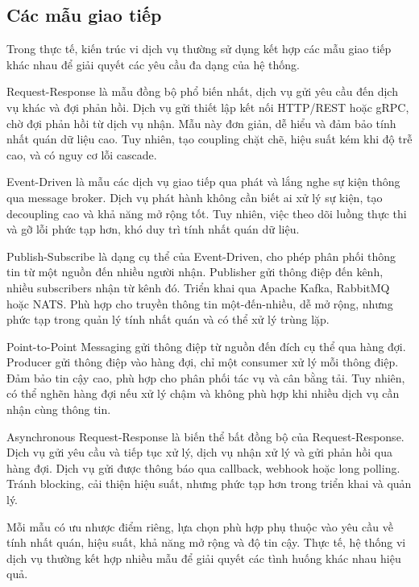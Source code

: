 \subsection{Các mẫu giao tiếp}
Trong thực tế, kiến trúc vi dịch vụ thường sử dụng kết hợp các mẫu giao tiếp khác nhau để giải quyết các yêu cầu đa dạng của hệ thống.

Request-Response là mẫu đồng bộ phổ biến nhất, dịch vụ gửi yêu cầu đến dịch vụ khác và đợi phản hồi. Dịch vụ gửi thiết lập kết nối HTTP/REST hoặc gRPC, chờ đợi phản hồi từ dịch vụ nhận. Mẫu này đơn giản, dễ hiểu và đảm bảo tính nhất quán dữ liệu cao. Tuy nhiên, tạo coupling chặt chẽ, hiệu suất kém khi độ trễ cao, và có nguy cơ lỗi cascade.

Event-Driven là mẫu các dịch vụ giao tiếp qua phát và lắng nghe sự kiện thông qua message broker. Dịch vụ phát hành không cần biết ai xử lý sự kiện, tạo decoupling cao và khả năng mở rộng tốt. Tuy nhiên, việc theo dõi luồng thực thi và gỡ lỗi phức tạp hơn, khó duy trì tính nhất quán dữ liệu.

Publish-Subscribe là dạng cụ thể của Event-Driven, cho phép phân phối thông tin từ một nguồn đến nhiều người nhận. Publisher gửi thông điệp đến kênh, nhiều subscribers nhận từ kênh đó. Triển khai qua Apache Kafka, RabbitMQ hoặc NATS. Phù hợp cho truyền thông tin một-đến-nhiều, dễ mở rộng, nhưng phức tạp trong quản lý tính nhất quán và có thể xử lý trùng lặp.

Point-to-Point Messaging gửi thông điệp từ nguồn đến đích cụ thể qua hàng đợi. Producer gửi thông điệp vào hàng đợi, chỉ một consumer xử lý mỗi thông điệp. Đảm bảo tin cậy cao, phù hợp cho phân phối tác vụ và cân bằng tải. Tuy nhiên, có thể nghẽn hàng đợi nếu xử lý chậm và không phù hợp khi nhiều dịch vụ cần nhận cùng thông tin.

Asynchronous Request-Response là biến thể bất đồng bộ của Request-Response. Dịch vụ gửi yêu cầu và tiếp tục xử lý, dịch vụ nhận xử lý và gửi phản hồi qua hàng đợi. Dịch vụ gửi được thông báo qua callback, webhook hoặc long polling. Tránh blocking, cải thiện hiệu suất, nhưng phức tạp hơn trong triển khai và quản lý.

Mỗi mẫu có ưu nhược điểm riêng, lựa chọn phù hợp phụ thuộc vào yêu cầu về tính nhất quán, hiệu suất, khả năng mở rộng và độ tin cậy. Thực tế, hệ thống vi dịch vụ thường kết hợp nhiều mẫu để giải quyết các tình huống khác nhau hiệu quả.